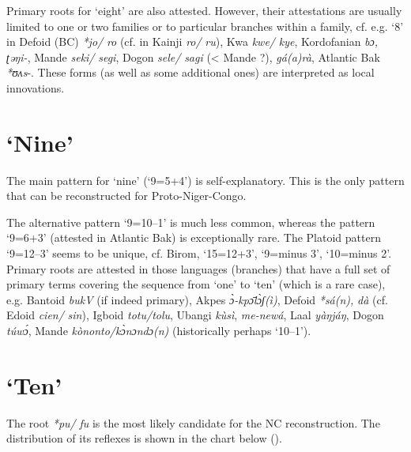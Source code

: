 Primary roots for ‘eight’ are also attested. However, their attestations are usually limited to one or two families or to particular branches within a family, cf. e.g. ‘8’ in Defoid (BC) \textit{*jo/} \textit{ro} (cf. in Kainji \textit{ro/} \textit{ru}), Kwa \textit{kwe/} \textit{kye}, Kordofanian \textit{bɔ,} \textit{ʈəŋi-}, Mande \textit{seki/} \textit{segi}, Dogon \textit{sele/} \textit{sagi} (< Mande ?), \textit{gá(a)rà}, Atlantic Bak \textit{*ʊʌs}-. These forms (as well as some additional ones) are interpreted as local innovations. 


\section{‘Nine’}%
 
The main pattern for ‘nine’ (‘9=5+4’) is self-explanatory. This is the only pattern that can be reconstructed for Proto-Niger-Congo.

The alternative pattern ‘9=10--1’ is much less common, whereas the pattern ‘9=6+3’ (attested in Atlantic Bak) is exceptionally rare. The Platoid pattern ‘9=12--3’ seems to be unique, cf. Birom, ‘15=12+3’, ‘9=minus 3’, ‘10=minus 2’. Primary roots are attested in those languages (branches) that have a full set of primary terms covering the sequence from ‘one’ to ‘ten’ (which is a rare case), e.g. Bantoid \textit{bukV} (if indeed primary), Akpes \textit{{\`{ɔ}}-kp{\={ɔ}}l{\`{ɔ}}ʃ(ì)}, Defoid \textit{*sá(n),} \textit{dà} (cf. Edoid \textit{cien/} \textit{sin}), Igboid \textit{totu/tolu}, Ubangi \textit{k{\`{u}}sì}, \textit{me-newá}, Laal \textit{yàŋjáŋ}, Dogon \textit{túw{\'{ɔ}}}, Mande \textit{kònonto/k{\`{ɔ}}nɔndɔ(n)} (historically perhaps ‘10--1’).


\section{‘Ten’}%
The root \textit{*pu/} \textit{fu} is the most likely candidate for the NC reconstruction. The distribution of its reflexes is shown in the chart below ().

